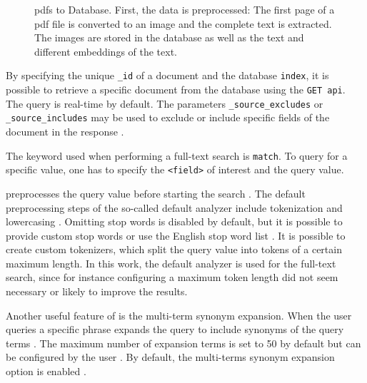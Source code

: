 \begin{figure}[htp] %
    \centering
    
    \caption{\acp{pdf} to Database. 
    First, the data is preprocessed:
    The first page of a \ac{pdf} file is converted to an image and the complete text is extracted. 
    The images are stored in the database as well as the text and different embeddings of the text.
    }
    \label{fig:pdf2db}
\end{figure}

By specifying the unique \texttt{\_id} of a document and the database \texttt{index}, it is possible to retrieve a specific document from the database using the \texttt{GET \ac{api}}.
The query is real-time by default.
The parameters \texttt{\_source\_excludes} or \texttt{\_source\_includes} may be used to exclude or include specific fields of the document in the response \cite{Elasticsearch-get}.

The keyword used when performing a full-text search is \texttt{match}.
To query for a specific value, one has to specify the \texttt{<field>} of interest and the query value.

\databaseName{} preprocesses the query value before starting the search \cite{Elasticsearch-text-analyser}.
The default preprocessing steps of the so-called default analyzer include tokenization and lowercasing \cite{Elasticsearch-text-analyser}. 
Omitting stop words is disabled by default, but it is possible to provide custom stop words or use the English stop word list \cite{Elasticsearch-text-analyser}.
It is possible to create custom tokenizers, which split the query value into tokens of a certain maximum length.
In this work, the default analyzer is used for the full-text search, since for instance configuring a maximum token length did not seem necessary or likely to improve the results.

Another useful feature of \databaseName{} is the multi-term synonym expansion.
When the user queries a specific phrase \databaseName{} expands the query to include synonyms of the query terms \cite{Elasticsearch-synonyms}.
The maximum number of expansion terms is set to 50 by default but can be configured by the user \cite{Elasticsearch-match}.
By default, the multi-terms synonym expansion option is enabled \cite{Elasticsearch-match}.

